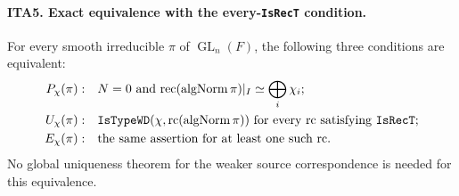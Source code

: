 \documentclass[11pt,a4paper]{article}
\numberwithin{equation}{section}
\theoremstyle{remark}\newtheorem{remark}[theorem]{Remark}
\begin{document}
\paragraph{ITA5. Exact equivalence with the every-\texttt{Is\allowbreak Rec\allowbreak T} condition.}
\label{claim:ITA5}
For every smooth irreducible $\pi$ of $\operatorname{GL}_n(F)$,
the following three conditions are equivalent:
\begin{align*}
 P_\chi(\pi):\quad &N=0\text{ and }
     \mathrm{rec}(\operatorname{algNorm}\pi)|_I
                                  \simeq\bigoplus_i\chi_i;\\
 U_\chi(\pi):\quad &\texttt{Is\allowbreak Type\allowbreak WD}
       (\chi,\mathrm{rc}(\operatorname{algNorm}\pi))
                     \text{ for every }\mathrm{rc}\text{ satisfying }
                     \texttt{Is\allowbreak Rec\allowbreak T};\\
 E_\chi(\pi):\quad &\text{the same assertion for at least one such }
                     \mathrm{rc}.
\end{align*}
No global uniqueness theorem for the weaker source correspondence
is needed for this equivalence.
\end{document}
